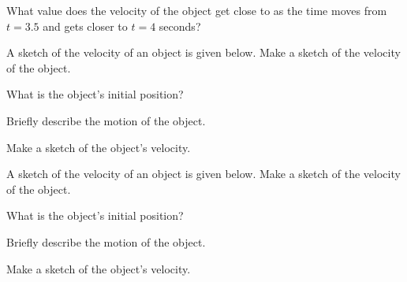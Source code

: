 \begin{problem}
    \scalebox{0.8}{}

    \begin{subproblem}
    \item What value does the velocity of the object get close to as
      the time moves from $t=3.5$ and gets closer to $t=4$ seconds?
    \end{subproblem}

    \clearpage

    \item A sketch of the velocity of an object is given below.
      Make a sketch of the velocity of the object.

      \scalebox{0.8}{}

      \begin{subproblem}
      \item What is the object's initial position?
      \item Briefly describe the motion of the object.
        \vfill
      \item Make a sketch of the object's velocity.
      \end{subproblem}

    \clearpage


    \item A sketch of the velocity of an object is given below.
      Make a sketch of the velocity of the object.

      \scalebox{0.8}{}

      \begin{subproblem}
      \item What is the object's initial position?
      \item Briefly describe the motion of the object.
        \vfill
      \item Make a sketch of the object's velocity.
      \end{subproblem}

      \clearpage

\end{problem}

\postClass

